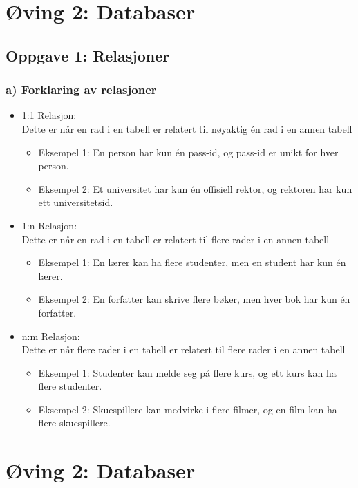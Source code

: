 \documentclass{article}
\begin{document}
\section*{Øving 2: Databaser}

\subsection*{Oppgave 1: Relasjoner}
\subsubsection*{a) Forklaring av relasjoner}
\begin{itemize}
    \item 1:1 Relasjon:\\ Dette er når en rad i en tabell er relatert til nøyaktig én rad i en annen tabell
    \begin{itemize}
        \item Eksempel 1: En person har kun én pass-id, og pass-id er unikt for hver person.
        \item Eksempel 2: Et universitet har kun én offisiell rektor, og rektoren har kun ett universitetsid.
    \end{itemize}
    \item 1:n Relasjon: \\ Dette er når en rad i en tabell er relatert til flere rader i en annen tabell
    \begin{itemize}
        \item Eksempel 1: En lærer kan ha flere studenter, men en student har kun én lærer.
        \item Eksempel 2: En forfatter kan skrive flere bøker, men hver bok har kun én forfatter.
    \end{itemize}
    \item n:m Relasjon: \\ Dette er når flere rader i en tabell er relatert til flere rader i en annen tabell
    \begin{itemize}
        \item Eksempel 1: Studenter kan melde seg på flere kurs, og ett kurs kan ha flere studenter.
        \item Eksempel 2: Skuespillere kan medvirke i flere filmer, og en film kan ha flere skuespillere.
    \end{itemize}
\end{itemize}

\section*{Øving 2: Databaser}
\end{document}

